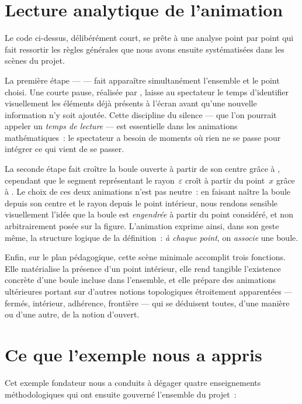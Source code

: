 \documentclass[12pt, a4paper, openany]{report}
\begin{document}
	\section{Lecture analytique de l’animation}

	Le code ci-dessus, délibérément court, se prête à une analyse point par point qui fait ressortir les règles générales que nous avons ensuite systématisées dans les scènes du projet.

	La première étape —  — fait apparaître simultanément l’ensemble et le point choisi. Une courte pause, réalisée par , laisse au spectateur le temps d’identifier visuellement les éléments déjà présents à l’écran avant qu’une nouvelle information n’y soit ajoutée. Cette discipline du silence — que l’on pourrait appeler un \emph{temps de lecture} — est essentielle dans les animations mathématiques~: le spectateur a besoin de moments où rien ne se passe pour intégrer ce qui vient de se passer.

	La seconde étape fait croître la boule ouverte à partir de son centre grâce à , cependant que le segment représentant le rayon~$\varepsilon$ croît à partir du point~$x$ grâce à . Le choix de ces deux animations n’est pas neutre~: en faisant naître la boule depuis son centre et le rayon depuis le point intérieur, nous rendons sensible visuellement l’idée que la boule est \emph{engendrée} à partir du point considéré, et non arbitrairement posée sur la figure. L’animation exprime ainsi, dans son geste même, la structure logique de la définition~: \emph{à chaque point}, on \emph{associe} une boule.

	Enfin, sur le plan pédagogique, cette scène minimale accomplit trois fonctions. Elle matérialise la présence d’un point intérieur, elle rend tangible l’existence concrète d’une boule incluse dans l’ensemble, et elle prépare des animations ultérieures portant sur d’autres notions topologiques étroitement apparentées — fermés, intérieur, adhérence, frontière — qui se déduisent toutes, d’une manière ou d’une autre, de la notion d’ouvert.

	\section{Ce que l’exemple nous a appris}

	Cet exemple fondateur nous a conduits à dégager quatre enseignements méthodologiques qui ont ensuite gouverné l’ensemble du projet~:
\end{document}
